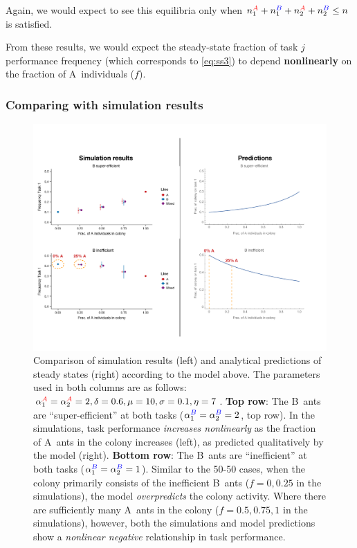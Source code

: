 \documentclass[10pt]{article}
\theoremstyle{remark}
\newcommand{\A}{{\color{red}A}}
\newcommand{\B}{{\color{blue}B}}
\begin{document}
Again, we would expect to see this equilibria only when $n_1^{\A} + n_1^{\B} + n_2^{\A}+ n_2^{\B} \leq n$ is satisfied.

From these results, we would expect the steady-state fraction of task $j$ performance frequency (which corresponds to \eqref{eq:ss3}) to depend \textbf{nonlinearly} on the fraction of \A\ individuals ($f$). \\

\subsubsection{Comparing with simulation results}
\begin{figure}[H]
    \centering
    \includegraphics[trim={0 1in 0 0.75in}, clip, width=0.9\linewidth]{mixes_comparison.pdf}
    \caption{Comparison of simulation results (left) and analytical predictions of steady states (right) according to the model above. The parameters used in both columns are as follows: $\alpha_1^{\A} = \alpha_2^{\A} = 2, \delta= 0.6, \mu=10, \sigma = 0.1, \eta = 7$. 
    \textbf{Top row}: The \B\ ants are ``super-efficient'' at both tasks ($\alpha_1^{\B} = \alpha_2^{\B} = 2$, top row). In the simulations, task performance \textit{increases nonlinearly} as the fraction of \A\ ants in the colony increases (left), as predicted qualitatively by the model (right).
    \textbf{Bottom row}: The \B\ ants are ``inefficient'' at both tasks ($\alpha_1^{\B} = \alpha_2^{\B} = 1$). 
    Similar to the 50-50 cases, when the colony primarily consists of the inefficient \B\ ants ($f = 0, 0.25$ in the simulations), the model \textit{overpredicts} the colony activity.
    Where there are sufficiently many \A\ ants in the colony ($f = 0.5, 0.75, 1$ in the simulations), however, both the simulations and model predictions show a \textit{nonlinear negative} relationship in task performance.}
    \label{fig:mixes_comp}
\end{figure}
\end{document}
